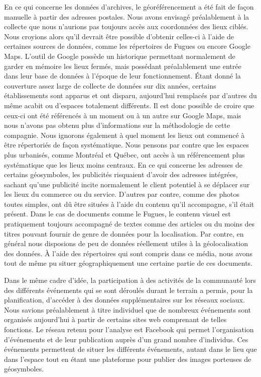 En ce qui concerne les données d'archives, le géoréférencement a été fait de façon manuelle à partir des adresses postales. 
Nous avons envisagé préalablement à la collecte que nous n'aurions pas toujours accès aux coordonnées des lieux ciblés. 
Nous croyions alors qu'il devrait être possible d'obtenir celles-ci à l'aide de certaines sources de données, comme les répertoires de Fugues ou encore Google Maps.
L'outil de Google possède un historique permettant normalement de garder en mémoire les lieux fermés, mais possédant préalablement une entrée dans leur base de données à l'époque de leur fonctionnement. 
Étant donné la couverture assez large de collecte de données sur dix années, certains établissements sont apparus et ont disparu, aujourd'hui remplacés par d'autres du même acabit ou d'espaces totalement différents. 
Il est donc possible de croire que ceux-ci ont été référencés à un moment ou à un autre sur Google Maps, mais nous n'avons pas obtenu plus d'informations sur la méthodologie de cette compagnie.
Nous ignorons également à quel moment les lieux ont commencé à être répertoriés de façon systématique.
Nous pensons par contre que les espaces plus urbanisés, comme Montréal et Québec, ont accès à un référencement plus systématique que les lieux moins centraux.
En ce qui concerne les adresses de certains géosymboles,  les publicités risquaient d'avoir des adresses intégrées, sachant qu'une publicité incite normalement le client potentiel à se déplacer sur les lieux du commerce ou du service.
D'autres par contre, comme des photos toutes simples, ont dû être situées à l'aide du contenu qu'il accompagne, s'il était présent.  
Dans le cas de documents comme le Fugues, le contenu visuel est pratiquement toujours accompagné de textes comme des articles ou du moins des titres pouvant fournir de genre de données pour la localisation. 
Par contre, en général nous disposions de peu de données réellement utiles à la géolocalisation des données. 
À l'aide des répertoires qui sont compris dans ce média, nous avons tout de même pu situer géographiquement une certaine partie de ces documents.

Dans le même cadre d'idée, la participation à des activités de la communauté \lgbt{} lors des différents événements qui se sont déroulés durant le terrain a permis, pour la planification, d'accéder à des données supplémentaires sur les réseaux sociaux. 
Nous savions préalablement à titre individuel que de nombreux événements sont organisés aujourd'hui à partir de certains sites web comprenant de telles fonctions. 
Le réseau retenu pour l'analyse est Facebook qui permet l'organisation d'événements et de leur publication auprès d'un grand nombre d'individus. 
Ces événements permettent de situer les différents événements, autant dans le lieu que dans l'espace tout en étant une plateforme pour publier des images porteuses de géosymboles.
\citep{Barkhuus2010} \citep{Boyd2010}

